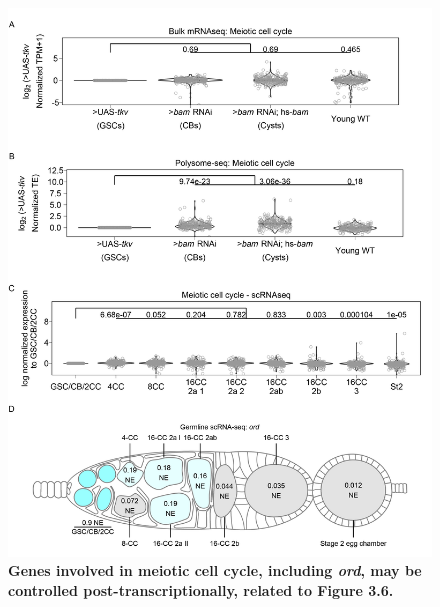 \documentclass[12pt,oneside]{reedthesis}
\begin{document}
\begin{figure}

{\centering \includegraphics[width=1\linewidth]{./figure/Oo_site/Supplemental_Figure3} 

}

\caption[\textbf{Genes involved in meiotic cell cycle, including \emph{ord}, may be controlled post-transcriptionally, related to Figure 3.6.}]{\textbf{Genes involved in meiotic cell cycle, including \emph{ord}, may be controlled post-transcriptionally, related to Figure 3.6.}}\label{fig:oosite-fig-7}
\end{figure}
\end{document}
